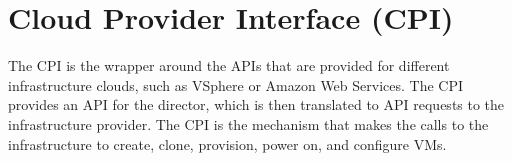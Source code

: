 \chapter{Cloud Provider Interface (CPI)}
\label{cloudproviderinterfacecpi}

The CPI is the wrapper around the APIs that are provided for different infrastructure clouds, such as VSphere or Amazon Web Services. The CPI provides an API for the director, which is then translated to API requests to the infrastructure provider. The CPI is the mechanism that makes the calls to the infrastructure to create, clone, provision, power on, and configure VMs.




